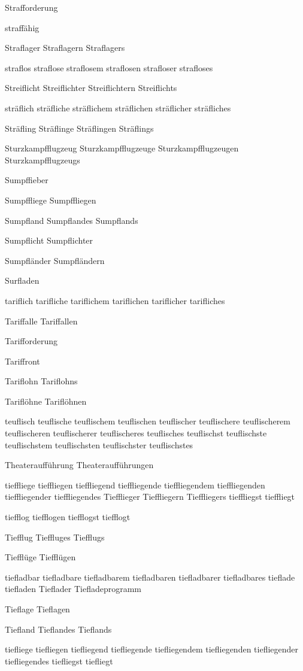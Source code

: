 Strafforderung

straffähig

Straflager Straflagern Straflagers

straflos straflose straflosem straflosen strafloser strafloses

Streiflicht Streiflichter Streiflichtern Streiflichts

sträflich sträfliche sträflichem sträflichen sträflicher sträfliches

Sträfling Sträflinge Sträflingen Sträflings

Sturzkampfflugzeug Sturzkampfflugzeuge Sturzkampfflugzeugen Sturzkampfflugzeugs

Sumpffieber

Sumpffliege Sumpffliegen

Sumpfland Sumpflandes Sumpflands

Sumpflicht Sumpflichter

Sumpfländer Sumpfländern

Surfladen

tariflich tarifliche tariflichem tariflichen tariflicher tarifliches

Tariffalle Tariffallen

Tarifforderung

Tariffront

Tariflohn Tariflohns

Tariflöhne Tariflöhnen

teuflisch teuflische teuflischem teuflischen teuflischer teuflischere teuflischerem teuflischeren teuflischerer teuflischeres teuflisches teuflischst teuflischste teuflischstem teuflischsten teuflischster teuflischstes

Theateraufführung Theateraufführungen

tieffliege tieffliegen tieffliegend tieffliegende tieffliegendem tieffliegenden tieffliegender tieffliegendes Tiefflieger Tieffliegern Tieffliegers tieffliegst tieffliegt

tiefflog tiefflogen tiefflogst tiefflogt

Tiefflug Tieffluges Tiefflugs

Tiefflüge Tiefflügen

tiefladbar tiefladbare tiefladbarem tiefladbaren tiefladbarer tiefladbares tieflade tiefladen Tieflader Tiefladeprogramm

Tieflage Tieflagen

Tiefland Tieflandes Tieflands

tiefliege tiefliegen tiefliegend tiefliegende tiefliegendem tiefliegenden tiefliegender tiefliegendes tiefliegst tiefliegt

